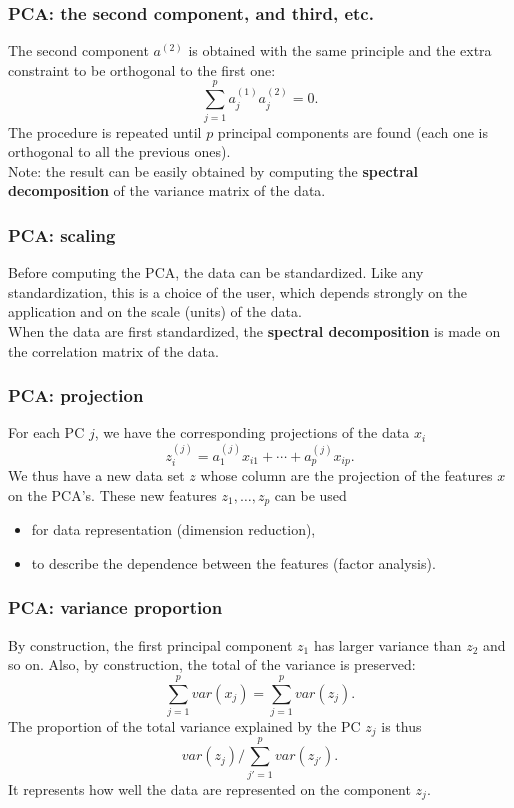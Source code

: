 \begin{frame}
\frametitle{PCA: the second component, and third, etc.}
The second component $a^{(2)}$ is obtained with the same principle and the extra constraint to be orthogonal to the first one:
$$
\sum_{j=1}^p a^{(1)}_j a^{(2)}_j = 0.
$$
The procedure is repeated until $p$ principal components are found (each one is orthogonal to all the previous ones). \\
\vspace{0.3cm}
Note: the result can be easily obtained by computing the {\bf spectral decomposition} of the variance matrix of the data. 
\end{frame}
\begin{frame}
\frametitle{PCA: scaling}
Before computing the PCA, the data can be standardized. Like any standardization, this is a choice of the user, which depends strongly on the application and on the scale (units) of the data. \\
\vspace{0.3cm}
When the data are first standardized, the {\bf spectral decomposition} is made on the correlation matrix of the data. 
\end{frame}
\begin{frame}
\frametitle{PCA: projection}
For each PC $j$, we have the corresponding projections of the data $x_i$
$$
z_i^{(j)} = a^{(j)}_1 x_{i1} + \cdots + a^{(j)}_p x_{ip}.
$$
We thus have a new data set $z$ whose column are the projection of the features $x$ on the PCA's. These new features $z_1, \ldots, z_p$ can be used 
\begin{itemize}
\item for data representation (dimension reduction),
\item to describe the dependence between the features (factor analysis).  
\end{itemize}
\end{frame}
\begin{frame}
\frametitle{PCA: variance proportion}
By construction, the first principal component $z_1$ has larger variance than $z_2$ and so on. Also, by construction, the total of the variance is preserved:
$$
\sum_{j=1}^p var(x_j) = \sum_{j=1}^p var(z_j).
$$
The proportion of the total variance explained by the PC $z_j$ is thus
$$
var(z_j)/\sum_{j'=1}^p var(z_{j'}).
$$
It represents how well the data are represented on the component $z_j$.
\end{frame}
